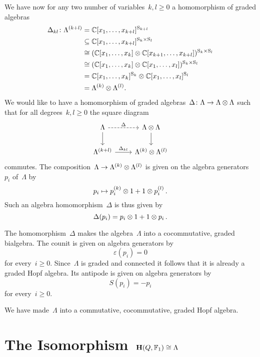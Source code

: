 \documentclass[a4paper,11pt]{scrartcl}
\begin{document}
We have now for any two number of variables~$k, l \geq 0$ a homomorphism of graded algebras
\begin{align*}
  \Delta_{kl}
  \colon
  \Lambda^{(k+l)}
  &=
  \mathbb{C}[x_1, \dotsc, x_{k+l}]^{\mathrm{S}_{k+l}}
  \\
  &\subseteq
  \mathbb{C}[x_1, \dotsc, x_{k+l}]^{\mathrm{S}_k \times \mathrm{S}_l}
  \\
  &\cong
  ( \mathbb{C}[x_1, \dotsc, x_k] \otimes \mathbb{C}[x_{k+1}, \dotsc, x_{k+l}] )^{\mathrm{S}_k \times \mathrm{S}_l}
  \\
  &\cong
  ( \mathbb{C}[x_1, \dotsc, x_k] \otimes \mathbb{C}[x_1, \dotsc, x_l] )^{\mathrm{S}_k \times \mathrm{S}_l}
  \\
  &=
  \mathbb{C}[x_1, \dotsc, x_k]^{\mathrm{S}_k} \otimes \mathbb{C}[x_1, \dotsc, x_l]^{\mathrm{S}_l}
  \\
  &=
  \Lambda^{(k)} \otimes \Lambda^{(l)}.
\end{align*}
We would like to have a homomorphism of graded algebras~$\Delta \colon \Lambda \to \Lambda \otimes \Lambda$ such that for all degrees~$k, l \geq 0$ the square diagram
\[
  \begin{tikzcd}
    \Lambda
    \arrow[dashed]{r}[above]{\Delta}
    \arrow{d}
    &
    \Lambda \tensor \Lambda
    \arrow{d}
    \\
    \Lambda^{(k+l)}
    \arrow{r}[above]{\Delta_{kl}}
    &
    \Lambda^{(k)} \tensor \Lambda^{(l)}
  \end{tikzcd}
\]
commutes.
The composition~$\Lambda \to \Lambda^{(k)} \otimes \Lambda^{(l)}$ is given on the algebra generators~$p_i$ of~$\Lambda$ by
\[
  p_i \mapsto p^{(k)}_i \otimes 1 + 1 \otimes p^{(l)}_i \,.
\]
Such an algebra homomorphism~$\Delta$ is thus given by
\[
  \Delta(p_i) = p_i \otimes 1 + 1 \otimes p_i \,.
\]

The homomorphism~$\Delta$ makes the algebra~$\Lambda$ into a cocommutative, graded bialgebra.
The counit is given on algebra generators by
\[
  \varepsilon(p_i) = 0
\]
for every~$i \geq 0$.
Since~$\Lambda$ is graded and connected it follows that it is already a graded Hopf algebra.
Its antipode is given on algebra generators by
\[
  S(p_i) = -p_i
\]
for every~$i \geq 0$.

We have made~$\Lambda$ into a commutative, cocommutative, graded Hopf algebra.





\section{The Isomorphism~$\mathbf{H}(Q, \mathbb{F}_1) \cong \Lambda$}
\end{document}
